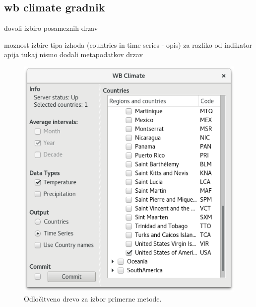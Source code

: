 \subsection{wb climate gradnik}

dovoli izbiro posameznih drzav 

moznost izbire tipa izhoda (countries in time series - opis)
za razliko od indikator apija tukaj nismo dodali metapodatkov drzav 



\begin{figure}
\begin{center}
\includegraphics[width=12cm]{pic/co2_temp_climate_selection.png}
\end{center}
\caption{Odločitveno drevo za izbor primerne metode.}
\label{co2_temp_indicator}
\end{figure} 
